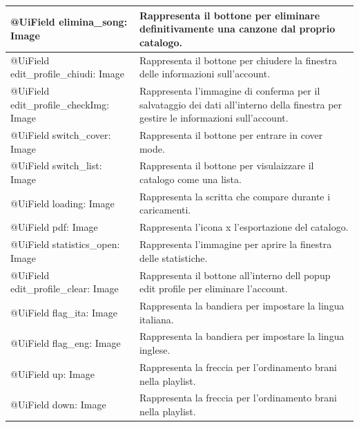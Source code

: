 \begin{longtable}{|p{}|p{}|}
@UiField elimina\_song: Image & Rappresenta il bottone per eliminare
definitivamente una canzone dal proprio catalogo. \\\hline
@UiField edit\_profile\_chiudi: Image & Rappresenta il bottone per
chiudere la finestra delle informazioni sull'account.\\\hline
@UiField edit\_profile\_checkImg: Image & Rappresenta l'immagine di
conferma per il salvataggio dei dati all'interno della finestra per
gestire le informazioni sull'account.\\\hline
@UiField switch\_cover: Image & Rappresenta il bottone per entrare in cover
mode. \\\hline
@UiField switch\_list: Image & Rappresenta il bottone per visulaizzare il
catalogo come una lista. \\\hline
@UiField loading: Image & Rappresenta la scritta che compare durante i
caricamenti. \\\hline
@UiField pdf: Image & Rappresenta l'icona x l'esportazione del catalogo.
\\\hline
@UiField statistics\_open: Image & Rappresenta l'immagine per aprire la finestra
delle statistiche. \\\hline
@UiField edit\_profile\_clear: Image & Rappresenta il bottone all'interno dell
popup edit profile per eliminare l'account.\\\hline
@UiField flag\_ita: Image & Rappresenta la bandiera per impostare la lingua
italiana. \\\hline
@UiField flag\_eng: Image & Rappresenta la bandiera per impostare la lingua
inglese. \\\hline
@UiField up: Image & Rappresenta la freccia per l'ordinamento brani nella
playlist. \\\hline
@UiField down: Image & Rappresenta la freccia per l'ordinamento brani nella
playlist. \\\hline


\end{longtable}
